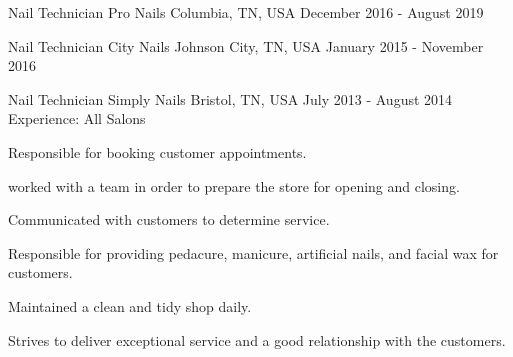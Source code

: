 

\begin{cventries}

  \cventry
    {Nail Technician} %
    {Pro Nails} %
    {Columbia, TN, USA} %
    {December 2016 - August 2019} %
    {
    }

  \cventry
  {Nail Technician}
  {City Nails}
  {Johnson City, TN, USA}
  {January 2015 - November 2016}
  {
  }

  \cventry
  {Nail Technician}
  {Simply Nails}
  {Bristol, TN, USA}
  {July 2013 - August 2014}
  {
  }
  \cventry
  {Experience:}
  {All Salons}
  {}
  {}
  {
  \begin{cvitems}
      \item Responsible for booking customer appointments.
      \item worked with a team in order to prepare the store for opening and closing.
      \item Communicated with customers to determine service.
      \item Responsible for providing pedacure, manicure, artificial nails, and facial wax for customers.
      \item Maintained a clean and tidy shop daily.
      \item Strives to deliver exceptional service and a good relationship with the customers.
  \end{cvitems}
  }


\end{cventries}
